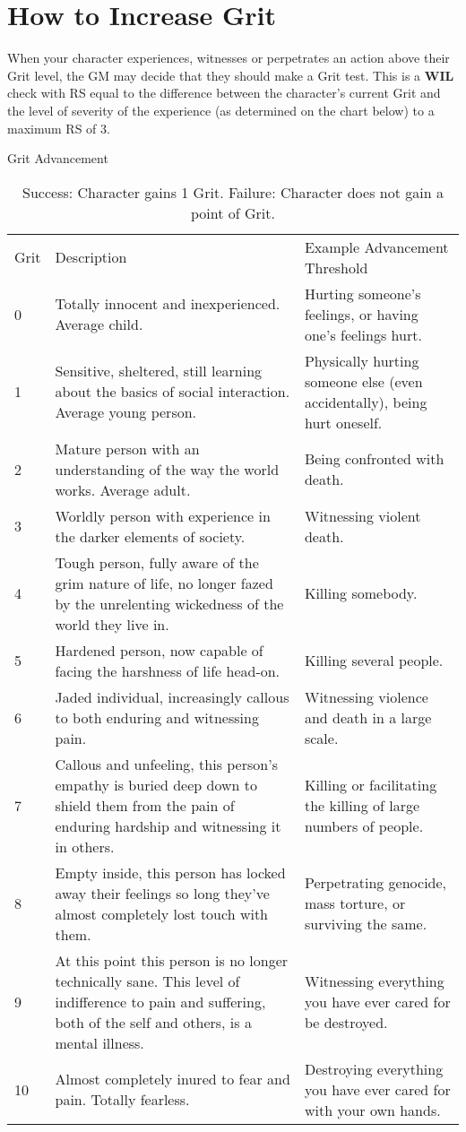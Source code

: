 \documentclass[oneside,11pt,english]{book}
\begin{document}
\section{How to Increase Grit}
When your character experiences, witnesses or perpetrates an action above their Grit level, the GM may 
decide that they should make a Grit test. This is a \textbf{WIL} check with RS equal to the difference between the character’s current Grit and the level of severity of the experience (as determined on the chart below) to a maximum RS of 3. 

\begin{table}
	\caption{Grit Advancement}
	\label{tab:GritAdvancement}
\begin{tabu} spread 0pt {lXX}
Grit&Description&Example Advancement Threshold\\
0&Totally innocent and inexperienced. Average child.&Hurting someone’s feelings, or having one’s feelings hurt. \\
1&Sensitive, sheltered, still learning about the basics of social interaction. Average young person. & Physically hurting someone else (even accidentally), being hurt oneself. \\
2& Mature person with an understanding of the way the world works. Average adult. &Being confronted with death. \\
3&Worldly person with experience in the darker elements of society.& Witnessing violent death.\\
4&Tough person, fully aware of the grim nature of life, no longer fazed by the unrelenting wickedness of the world they live in. &Killing somebody. \\
5& Hardened person, now capable of facing the harshness of life head-on.&Killing several people. \\
6& Jaded individual, increasingly callous to both enduring and witnessing pain. &Witnessing violence and death in a large scale. \\
7& Callous and unfeeling, this person’s empathy is buried deep down to shield them from the pain of enduring hardship and witnessing it in others. &Killing or facilitating the killing of large numbers of people. \\
8& Empty inside, this person has locked away their feelings so long they’ve almost completely lost touch with them. &Perpetrating genocide, mass torture, or surviving the same.\\
9&At this point this person is no longer technically sane. This level of indifference to pain and suffering, both of the self and others, is a mental illness. &Witnessing everything you have ever cared for be destroyed. \\
10& Almost completely inured to fear and pain. Totally fearless. &Destroying everything you have ever cared for with your own hands. \\
\end{tabu}
\vspace{0.5 cm}
		\caption*{Success: Character gains 1 Grit. Failure: Character does not gain a point of Grit.}
\end{table} 
\end{document}
